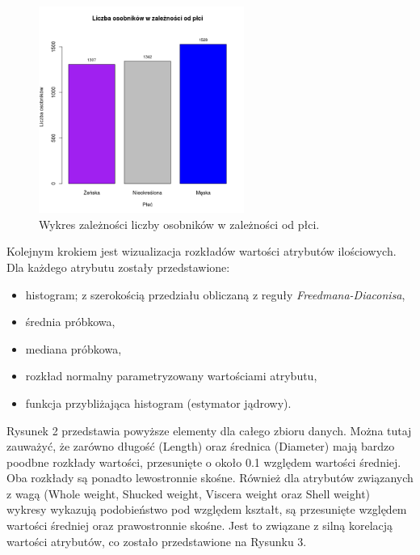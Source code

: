 \documentclass{scrartcl}
\begin{document}
  \begin{figure}[H]
    \center
    \includegraphics[width=0.6\textwidth]{plots/barplot_nb_instances.png}
    \caption{Wykres zależności liczby osobników w zależności od płci.}
  \end{figure}

  Kolejnym krokiem jest wizualizacja rozkładów wartości atrybutów ilościowych.
  Dla każdego atrybutu zostały przedstawione:
  \begin{itemize}
    \item{histogram; z szerokością przedziału obliczaną z reguły \textit{Freedmana-Diaconisa},}
    \item{średnia próbkowa,}
    \item{mediana próbkowa,}
    \item{rozkład normalny parametryzowany wartościami atrybutu,}
    \item{funkcja przybliżająca histogram (estymator jądrowy).}
  \end{itemize}

  Rysunek 2 przedstawia powyższe elementy dla całego zbioru danych.
  Można tutaj zauważyć, że zarówno długość (Length) oraz średnica (Diameter)
  mają bardzo poodbne rozkłady wartości, przesunięte o około 0.1 względem
  wartości średniej. Oba rozkłady są ponadto lewostronnie skośne. Również
  dla atrybutów związanych z wagą (Whole weight, Shucked weight, Viscera weight
  oraz Shell weight) wykresy wykazują podobieństwo pod względem kształt, są przesunięte
  względem wartości średniej oraz prawostronnie skośne. Jest to związane z silną korelacją
  wartości atrybutów, co zostało przedstawione na Rysunku 3. 
\end{document}

